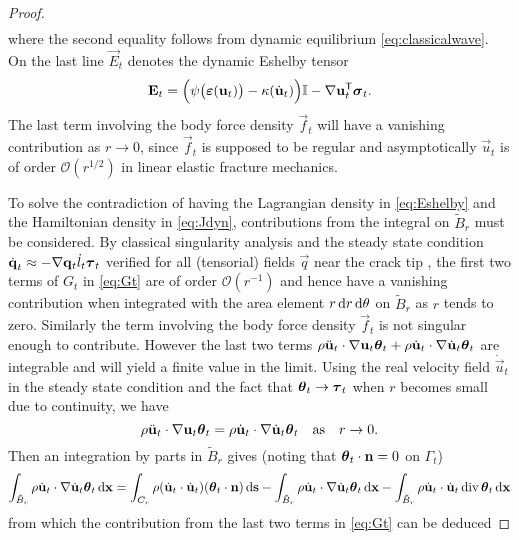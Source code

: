 \begin{proof}
\begin{align*}
\end{align*}
where the second equality follows from dynamic equilibrium \eqref{eq:classicalwave}. On the last line $\vec{E}_t$ denotes the dynamic Eshelby tensor \cite{Maugin:1994}
\begin{equation} \label{eq:Eshelby}
\vec{E}_t=\Bigl(\psi\bigl(\eps(\vec{u}_t)\bigr)-\kappa(\dot{\vec{u}}_t)\Bigr)\mathbb{I}-\nabla\vec{u}_t^\mT\sig_t.
\end{equation}
The last term involving the body force density $\vec{f}_t$ will have a vanishing contribution as $r\to 0$, since $\vec{f}_t$ is supposed to be regular and asymptotically $\vec{u}_t$ is of order $\mathcal{O}(r^{1/2})$ in linear elastic fracture mechanics.

To solve the contradiction \cite{Maugin:1994} of having the Lagrangian density in \eqref{eq:Eshelby} and the Hamiltonian density in \eqref{eq:Jdyn}, contributions from the integral on $\tilde{B}_r$ must be considered. By classical singularity analysis and the steady state condition $\dot{\vec{q}}_t\approx-\nabla\vec{q}_t\dot{l}_t\vtau_t$ verified for all (tensorial) fields $\vec{q}$ near the crack tip \cite{Freund:1990}, the first two terms of $G_t$ in \eqref{eq:Gt} are of order $\mathcal{O}(r^{-1})$ and hence have a vanishing contribution when integrated with the area element $r\,\mathrm{d}r\,\mathrm{d}\theta$ on $\tilde{B}_r$ as $r$ tends to zero. Similarly the term involving the body force density $\vec{f}_t$ is not singular enough to contribute. However the last two terms $\rho\ddot{\vec{u}}_t\cdot\nabla\vec{u}_t\vtheta_t+\rho\dot{\vec{u}}_t\cdot\nabla\dot{\vec{u}}_t\vtheta_t$ are integrable \cite{NishiokaAtluri:1983} and will yield a finite value in the limit. Using the real velocity field $\dot{\vec{u}}_t$ in the steady state condition and the fact that $\vtheta_t\to\vtau_t$ when $r$ becomes small due to continuity, we have
\[
\rho\ddot{\vec{u}}_t\cdot\nabla\vec{u}_t\vtheta_t=\rho\dot{\vec{u}}_t\cdot\nabla\dot{\vec{u}}_t\vtheta_t\quad\text{as}\quad r\to 0.
\]
Then an integration by parts in $\tilde{B}_r$ gives (noting that $\vtheta_t\cdot\vec{n}=0$ on $\Gamma_t$)
\begin{equation} \label{eq:magicformula}
\int_{\tilde{B}_r}\rho\dot{\vec{u}}_t\cdot\nabla\dot{\vec{u}}_t\vtheta_t\dx=\int_{C_r}\rho(\dot{\vec{u}}_t\cdot\dot{\vec{u}}_t)(\vtheta_t\cdot\vec{n})\ds-\int_{\tilde{B}_r}\rho\dot{\vec{u}}_t\cdot\nabla\dot{\vec{u}}_t\vtheta_t\dx-\int_{\tilde{B}_r}\rho\dot{\vec{u}}_t\cdot\dot{\vec{u}}_t\div\vtheta_t\dx
\end{equation}
from which the contribution from the last two terms in \eqref{eq:Gt} can be deduced

\end{proof}
